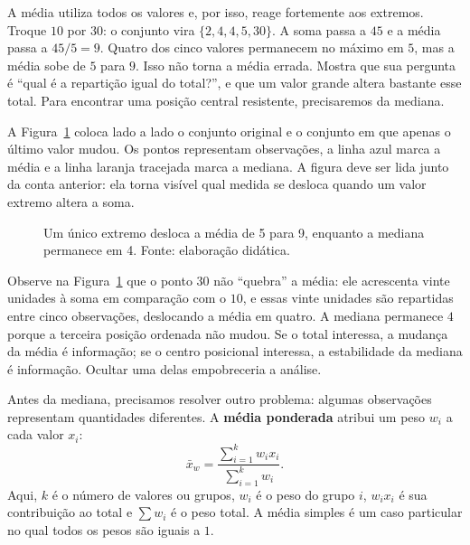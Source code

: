 A média utiliza todos os valores e, por isso, reage fortemente aos extremos. Troque $10$ por $30$: o conjunto vira $\{2,4,4,5,30\}$. A soma passa a $45$ e a média passa a $45/5=9$. Quatro dos cinco valores permanecem no máximo em $5$, mas a média sobe de $5$ para $9$. Isso não torna a média errada. Mostra que sua pergunta é ``qual é a repartição igual do total?'', e que um valor grande altera bastante esse total. Para encontrar uma posição central resistente, precisaremos da mediana.

A Figura~\ref{fig:efeito-outlier-centro} coloca lado a lado o conjunto original e o conjunto em que apenas o último valor mudou. Os pontos representam observações, a linha azul marca a média e a linha laranja tracejada marca a mediana. A figura deve ser lida junto da conta anterior: ela torna visível qual medida se desloca quando um valor extremo altera a soma.

\begin{figure}[htbp]
\centering
{}
\caption{Um único extremo desloca a média de 5 para 9, enquanto a mediana permanece em 4. Fonte: elaboração didática.}
\label{fig:efeito-outlier-centro}
\end{figure}

Observe na Figura~\ref{fig:efeito-outlier-centro} que o ponto $30$ não ``quebra'' a média: ele acrescenta vinte unidades à soma em comparação com o $10$, e essas vinte unidades são repartidas entre cinco observações, deslocando a média em quatro. A mediana permanece $4$ porque a terceira posição ordenada não mudou. Se o total interessa, a mudança da média é informação; se o centro posicional interessa, a estabilidade da mediana é informação. Ocultar uma delas empobreceria a análise.

Antes da mediana, precisamos resolver outro problema: algumas observações representam quantidades diferentes. A \textbf{média ponderada} atribui um peso $w_i$ a cada valor $x_i$:
\[
 \bar{x}_w=\frac{\sum_{i=1}^{k}w_i x_i}{\sum_{i=1}^{k}w_i}.
\]
Aqui, $k$ é o número de valores ou grupos, $w_i$ é o peso do grupo $i$, $w_ix_i$ é sua contribuição ao total e $\sum w_i$ é o peso total. A média simples é um caso particular no qual todos os pesos são iguais a $1$.

